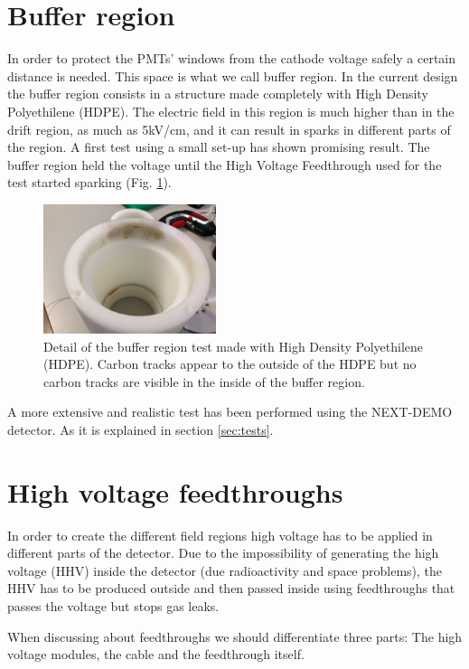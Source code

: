 \section{Buffer region}

In order to protect the PMTs' windows from the cathode voltage safely a certain distance is needed. This space is what we call buffer region. In the current design the buffer region consists in a structure made completely with High Density Polyethilene (HDPE). The electric field in this region is much higher than in the drift region, as much as 5kV/cm, and it can result in sparks in different parts of the region. A first test using a small set-up has shown promising result. The buffer region held the voltage until the High Voltage Feedthrough used for the test started sparking (Fig. \ref{fig:buff1}).

\begin{figure}[h!]
\centering
\includegraphics[width=0.45\textwidth]{img/buff1.JPG}
\caption{Detail of the buffer region test made with High Density Polyethilene (HDPE). Carbon tracks appear to the outside of the HDPE but no carbon tracks are visible in the inside of the buffer region. } \label{fig:buff1}
\end{figure}


A more extensive and realistic test has been performed using the NEXT-DEMO detector. As it is explained in section \ref{sec:tests}.


\section{High voltage feedthroughs}

In order to create the different field regions high voltage has to be applied in different parts of the detector. Due to the impossibility of generating the high voltage (HHV) inside the detector (due radioactivity and space problems), the HHV has to be produced outside and then passed inside using feedthroughs that passes the voltage but stops gas leaks.

When discussing about feedthroughs we should differentiate three parts: The high voltage modules, the cable and the feedthrough itself.

